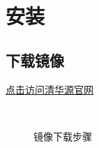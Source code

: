 \setcounter{page}{1} %
\chapter{安装}
\section{下载镜像} 
\href{https://mirrors.tuna.tsinghua.edu.cn/}{点击访问清华源官网}



\begin{figure}[h!]
	\subfloat[1]{\texttt{[image: 1]}}\\
	\subfloat[2]{\texttt{[image: 2]}}
	\caption{镜像下载步骤}
\end{figure}

  
